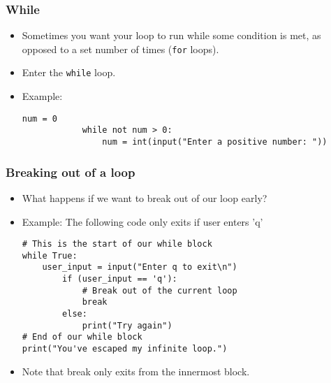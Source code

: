 \documentclass[presentation]{beamer}
\begin{document}
	\begin{frame}[fragile]
		\frametitle{While}
		\begin{itemize}
			\item Sometimes you want your loop to run while some condition is met, as opposed to a set number of times (\lstinline|for| loops).
			\item Enter the \lstinline|while| loop.
			\pause
			\item Example:
			\begin{lstlisting}[xleftmargin=\dimexpr-\leftmargini, basicstyle=\scriptsize\tt]
			num = 0
			while not num > 0:
			    num = int(input("Enter a positive number: "))
			\end{lstlisting}

		\end{itemize}
	\end{frame}
	
	\begin{frame}[fragile]
		\frametitle{Breaking out of a loop}
		\begin{itemize}
			\item What happens if we want to break out of our loop early?
			\item Example:
			The following code only exits if user enters 'q'
			\begin{lstlisting}[xleftmargin=\dimexpr-\leftmargini, basicstyle=\scriptsize\tt]
# This is the start of our while block
while True:
    user_input = input("Enter q to exit\n")
        if (user_input == 'q'):
            # Break out of the current loop
            break
        else:
            print("Try again")
# End of our while block
print("You've escaped my infinite loop.")
			\end{lstlisting}
			\pause
			\item Note that break only exits from the innermost block.

		\end{itemize}
	\end{frame}
	
\end{document}
